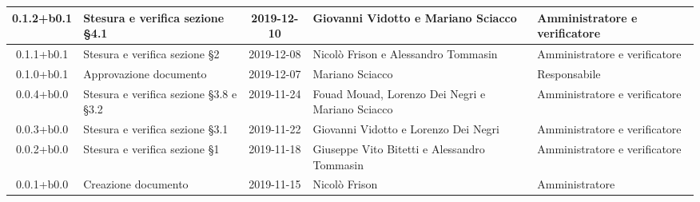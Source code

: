 \begin{center}
\begin{longtable}{|c|p{3cm}|c|p{4cm}|p{2.5cm}|}
	0.1.2+b0.1 & Stesura e verifica sezione \S4.1 & 2019-12-10 & Giovanni Vidotto e Mariano Sciacco & Amministratore e verificatore \\
	\hline
	0.1.1+b0.1 & Stesura e verifica sezione \S2  & 2019-12-08 & Nicolò Frison e Alessandro Tommasin & Amministratore e verificatore \\
	\hline
	0.1.0+b0.1 & Approvazione documento & 2019-12-07 & Mariano Sciacco & Responsabile \\
	\hline
	0.0.4+b0.0 & Stesura e verifica sezione \S3.8 e \S3.2 & 2019-11-24 & Fouad Mouad, Lorenzo Dei Negri e Mariano Sciacco & Amministratore e verificatore \\
	\hline
	0.0.3+b0.0 & Stesura e verifica sezione \S3.1 & 2019-11-22 & Giovanni Vidotto e Lorenzo Dei Negri & Amministratore e verificatore \\
	\hline
	0.0.2+b0.0 & Stesura e verifica sezione \S1 & 2019-11-18 & Giuseppe Vito Bitetti e Alessandro Tommasin & Amministratore e verificatore \\
	\hline
	0.0.1+b0.0 & Creazione documento & 2019-11-15 & Nicolò Frison & Amministratore  \\
	\hline

	\end{longtable}
\end{center}
